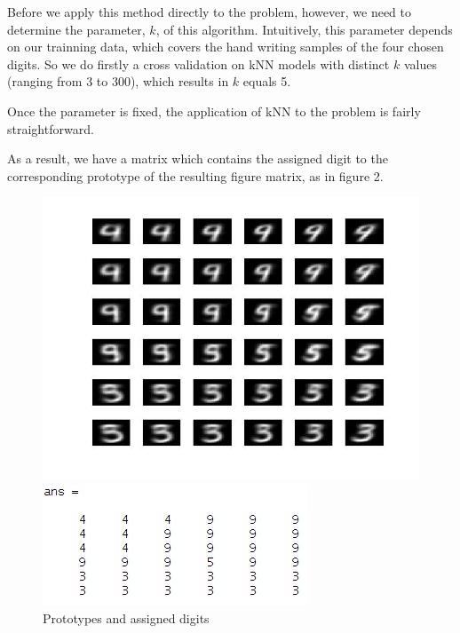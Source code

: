 \documentclass[a4paper, 12pt]{article}
\begin{document}
Before we apply this method directly to the problem, however, we need
to determine the parameter, $k$, of this algorithm. Intuitively, this
parameter depends on our trainning data, which covers the hand
writing samples of the four chosen digits. So we do firstly a cross
validation on kNN models with distinct $k$ values (ranging from 3 to 300),
which results in $k$ equals 5.

Once the parameter is fixed, the application of kNN to the problem is fairly straightforward.

As a result, we have a matrix which contains the assigned digit to the
corresponding prototype of the resulting figure matrix, as in figure 2.

\begin{figure}
  \centering
  \begin{minipage}[c]{0.5\textwidth}
    \centering
    \includegraphics[scale=0.4]{../figure/assign.jpg}
  \end{minipage}%
  \begin{minipage}[c]{0.5\textwidth}
    \centering
    \includegraphics[scale=0.8]{../figure/assignMatrix.jpg}
  \end{minipage}
  \caption{Prototypes and assigned digits}
\end{figure}
\end{document}
